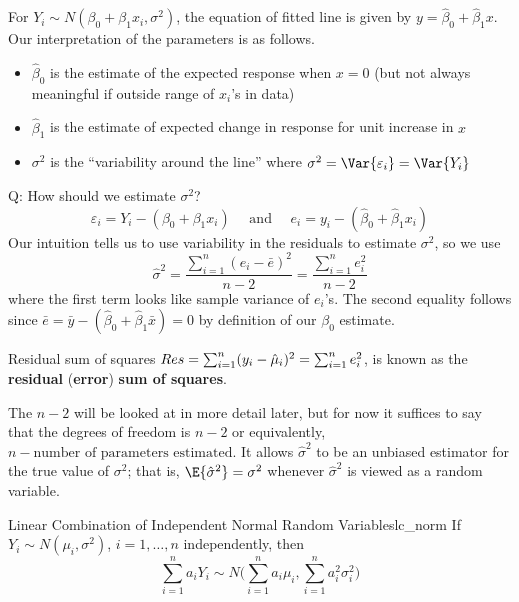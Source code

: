 For $ Y_i \sim N(\beta_0+\beta_1x_i,\sigma^2) $,
the equation of fitted line
is given by $ y=\hat{\beta}_0+\hat{\beta}_1x $. Our
interpretation of the parameters is as follows.
\begin{itemize}
    \item $ \hat{\beta}_0 $ is the estimate
          of the expected response when $ x=0 $ (but not always
          meaningful if outside range of $ x_i $'s in data)
    \item $ \hat{\beta}_1 $ is the estimate of
          expected change in response for unit increase in $ x $
    \item $ \sigma^2 $ is the
          ``variability around the line''
          where $ \sigma^2=\Var{\varepsilon_i}=\Var{Y_i} $
\end{itemize}
Q\@: How should we estimate $ \sigma^2 $?
\[ \varepsilon_i=Y_i-(\beta_0+\beta_1x_i)
    \quad\text{ and }\quad e_i=y_i-(\hat{\beta}_0+\hat{\beta}_1x_i) \]
Our intuition tells us to use variability in the residuals to estimate
$ \sigma^2 $, so we use
\[ \hat{\sigma}^2
    =\frac{\sum_{i=1}^{n} (e_i-\bar{e})^2}{n-2}=
    \frac{\sum_{i=1}^{n} e_i^2}{n-2}  \]
where the first term looks like sample variance of $ e_i $'s.
The second equality follows since
$ \bar{e}=\bar{y}-(\hat{\beta}_0+\hat{\beta}_1\bar{x})=0 $
by definition of our $ \beta_0 $ estimate.
\begin{Definition}{Residual sum of squares}{}
    $ \relax{Res}=
        \sum_{i=1}^{n} (y_i-\hat{\mu}_i)^2=
        \sum_{i=1}^{n} e_i^2 $,
    is known as the \textbf{residual} (\textbf{error})
    \textbf{sum of squares}.
\end{Definition}
\begin{Remark}{}{}
    The $ n-2 $ will be looked at in more detail later, but for now
    it suffices to say that the degrees of freedom
    is $ n-2 $ or equivalently, $ n- \text{number of parameters
            estimated}$. It allows $ \hat{\sigma}^2 $ to be an unbiased estimator
    for the true value of $ \sigma^2 $; that is,
    $ \E{\hat{\sigma}^2}=\sigma^2 $
    whenever $ \hat{\sigma}^2 $ is viewed as a random variable.
\end{Remark}
\begin{Theorem}{Linear Combination of Independent Normal Random Variables}{lc_norm}
    If $ Y_i \sim N(\mu_i,\sigma^2) $, $ i=1,\ldots,n $
    independently, then
    \[ \sum_{i=1}^{n} a_i Y_i \sim N
        \biggl( \sum_{i=1}^{n} a_i\mu_i,\sum_{i=1}^{n} a_i^2\sigma_i^2 \biggr) \]
\end{Theorem}
